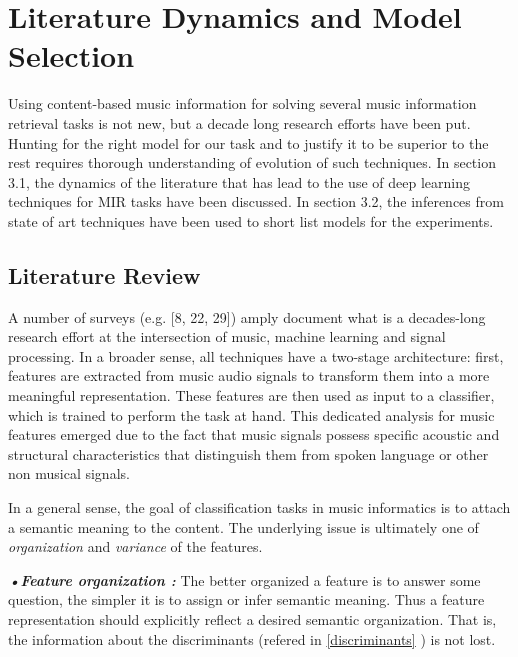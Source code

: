 
\chapter{Literature Dynamics and Model Selection } %

\label{Chapter3} %

Using content-based music information for solving several music information retrieval tasks is not new, but a decade long research efforts have been put. Hunting for the right model for our task and to justify it to be superior to the rest requires thorough understanding of evolution of such techniques. In section 3.1, the dynamics of the literature that has lead to the use of deep learning techniques for MIR tasks have been discussed. In section 3.2, the inferences from state of art techniques have been used to short list models for the experiments.       


\section{Literature Review}
\label{literature}
A number of surveys (e.g. [8, 22, 29]) amply document what is a decades-long research effort at the intersection of music, machine learning and signal processing. In a broader sense, all techniques have a two-stage architecture: first, features are extracted from music audio signals to transform them into a more meaningful representation. These features are then used as input to a classifier, which is trained to perform the task at hand. This dedicated analysis for music features emerged due to the fact that music signals possess specific acoustic and structural characteristics that distinguish them from spoken language or other non musical signals.
\bigskip

\noindent In a general sense, the goal of classification tasks in music informatics is to attach a semantic meaning to the content. The underlying issue is ultimately one of \textit{organization} and \textit{variance} of the features. 
\bigskip

\noindent \textit{\textbf{•Feature organization :}} The better organized a feature is to answer some question, the simpler it is to assign or infer semantic meaning. Thus a feature representation should explicitly reflect a desired semantic organization. That is, the information about the discriminants (refered in \ref{discriminants} ) is not lost.

